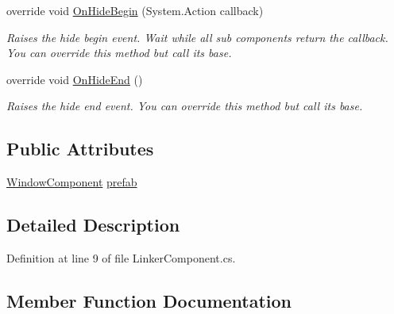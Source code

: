 \begin{DoxyCompactItemize}
override void \hyperlink{class_unity_engine_1_1_u_i_1_1_windows_1_1_components_1_1_linker_component_a57df78e71e945af1de85e8d59dc277ff}{On\+Hide\+Begin} (System.\+Action callback)
\begin{DoxyCompactList}\small\item\em Raises the hide begin event. Wait while all sub components return the callback. You can override this method but call it\textquotesingle{}s base. \end{DoxyCompactList}\item 
override void \hyperlink{class_unity_engine_1_1_u_i_1_1_windows_1_1_components_1_1_linker_component_a8e908f86dfd4361c8a177b57860e8962}{On\+Hide\+End} ()
\begin{DoxyCompactList}\small\item\em Raises the hide end event. You can override this method but call it\textquotesingle{}s base. \end{DoxyCompactList}\end{DoxyCompactItemize}
\subsection*{Public Attributes}
\begin{DoxyCompactItemize}
\item 
\hyperlink{class_unity_engine_1_1_u_i_1_1_windows_1_1_window_component}{Window\+Component} \hyperlink{class_unity_engine_1_1_u_i_1_1_windows_1_1_components_1_1_linker_component_a54c910f60ff07828363284a5ec99a7b3}{prefab}
\end{DoxyCompactItemize}


\subsection{Detailed Description}


Definition at line 9 of file Linker\+Component.\+cs.



\subsection{Member Function Documentation}
\hypertarget{class_unity_engine_1_1_u_i_1_1_windows_1_1_components_1_1_linker_component_a5469f90dba68bd5de121e36aac17409c}{}
